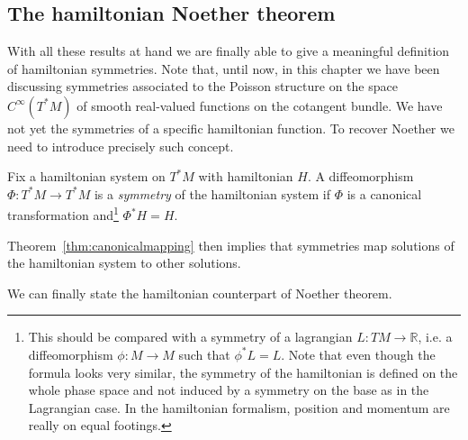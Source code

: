 \documentclass[english,fontsize=11pt,paper=a5,oneside]{scrbook}
\newcommand{\R}{\mathbb{R}}
\theoremstyle{definition}
\begin{document}
\subsection{The hamiltonian Noether theorem}

With all these results at hand we are finally able to give a meaningful definition of hamiltonian symmetries.
Note that, until now, in this chapter we have been discussing symmetries associated to the Poisson structure on the space $C^\infty(T^*M)$ of smooth real-valued functions on the cotangent bundle.
We have not yet the symmetries of a specific hamiltonian function.
To recover Noether we need to introduce precisely such concept.

\begin{tcolorbox}
  Fix a hamiltonian system on $T^*M$ with hamiltonian $H$. A diffeomorphism $\Phi:T^*M\to T^* M$ is a \emph{symmetry} of the hamiltonian system if $\Phi$ is a canonical transformation and\footnote{This should be compared with a symmetry of a lagrangian $L:TM \to\R$, i.e. a diffeomorphism $\phi: M \to M$ such that $\phi^* L = L$. Note that even though the formula looks very similar, the symmetry of the hamiltonian is defined on the whole phase space and not induced by a symmetry on the base as in the Lagrangian case. In the hamiltonian formalism, position and momentum are really on equal footings.} $\Phi^* H = H$.
\end{tcolorbox}

Theorem~\ref{thm:canonicalmapping} then implies that symmetries map solutions of the hamiltonian system to other solutions.

We can finally state the hamiltonian counterpart of Noether theorem.
\end{document}
